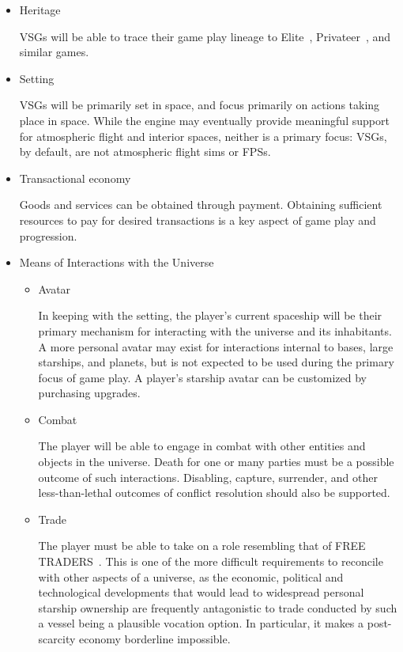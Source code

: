 \begin{itemize}

\item Heritage

VSGs will be able to trace their game play lineage to Elite~\cite{Elite},
Privateer~\cite{Privateer}, and similar games.

\item Setting

VSGs will be primarily set in space, and focus primarily on actions
taking place in space. While the engine may eventually provide meaningful support for atmospheric flight and interior spaces, neither is a primary focus: VSGs, by default, are not atmospheric flight sims or FPSs.

\item Transactional economy

Goods and services can be obtained through payment. Obtaining
sufficient resources to pay for desired transactions is a key aspect
of game play and progression.

\item Means of Interactions with the Universe

\begin{itemize}
\item Avatar

In keeping with the setting, the player's current spaceship will be
their primary mechanism for interacting with the universe and its
inhabitants. A more personal avatar may exist for interactions
internal to bases, large starships, and planets, but is not expected
to be used during the primary focus of game play. A player's
starship avatar can be customized by purchasing upgrades.

\item Combat

The player will be able to engage in combat with other entities and
objects in the universe. Death for one or many parties must be a
possible outcome of such interactions. Disabling, capture, surrender,
and other less-than-lethal outcomes of conflict resolution should also
be supported.

\item Trade

The player must be able to take on a role resembling that of FREE
TRADERS~\cite{TOUGHGUIDE}. This is one of the more difficult
requirements to reconcile with other aspects of a universe, as the
economic, political and technological developments that would lead to
widespread personal starship ownership are frequently antagonistic to
trade conducted by such a vessel being a plausible vocation option. In
particular, it makes a post-scarcity economy borderline impossible.


\end{itemize}
\end{itemize}
